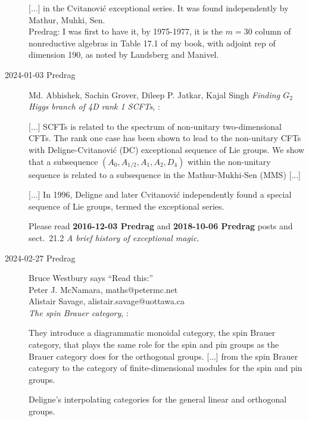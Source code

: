 \begin{description}
[...] in the Cvitanovi{\'c} exceptional series. It was found independently
by Mathur, Muhki, Sen.
\\
Predrag:  I was first to have it, by 1975-1977, it is the $m=30$ column of
nonreductive algebras in Table 17.1 of my book, with adjoint rep of
dimension 190, as noted by Landsberg and Manivel.

\item[2024-01-03 Predrag]
Md. Abhishek, Sachin Grover, Dileep P. Jatkar, Kajal Singh %
{\em Finding $G_2$ Higgs branch of 4D rank 1 SCFTs},
:

[...] SCFTs is related to the spectrum of non-unitary two-dimensional
CFTs. The rank one case has been shown to lead to the non-unitary CFTs
with Deligne-Cvitanovi{\'c} (DC) exceptional sequence of Lie groups. We show
that a subsequence $(A_0,A_{1/2},A_1,A_2,D_4)$ within the non-unitary sequence is
related to a subsequence in the Mathur-Mukhi-Sen (MMS) [...]

[...]
In 1996, Deligne and later Cvitanovi{\'c} independently found a special sequence
of Lie groups, termed the exceptional series.

Please read {\bf 2016-12-03 Predrag} and {\bf 2018-10-06 Predrag}
posts and
{sect.~21.2} {\em A brief history of exceptional magic}.

\item[2024-02-27 Predrag]
{Bruce Westbury} says ``Read this:''
\\
 {Peter J. McNamara}, maths@petermc.net
\\
 {Alistair Savage}, alistair.savage@uottawa.ca
\\
{\em The spin Brauer category},
:

They introduce a diagrammatic monoidal category,
the spin Brauer category, that plays the same role for the spin
and pin groups as the Brauer category does for the orthogonal groups.
[...]
from the spin Brauer category to the category of
finite-dimensional modules for the spin and pin groups.

Deligne’s interpolating categories for the
general linear and orthogonal groups.



\end{description}
